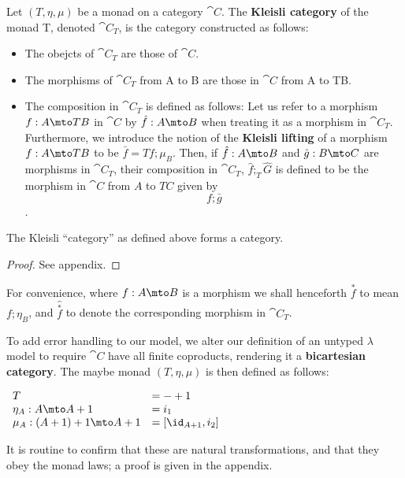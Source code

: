\begin{definition}
  Let $(T,\eta,\mu)$ be a monad on a category $\cat{C}$. The \textbf{Kleisli category}
  of the monad T, denoted $\cat{C}_T$, is the category constructed as follows:
  \begin{itemize}
    \item The obejcts of $\cat{C}_T$ are those of $\cat{C}$.
    \item The morphisms of $\cat{C}_T$ from A to B are those in $\cat{C}$ from A to TB.
    \item The composition in $\cat{C}_T$ is defined as follows: Let us refer to a
      morphism $f: A \mto TB$ in $\cat{C}$ by $\hat{f} : A \mto B$ when treating it as
      a morphism in $\cat{C}_T$. Furthermore, we introduce the notion of the \textbf{Kleisli
      lifting} of a morphism $f: A \mto TB$ to be $\bar{f} = Tf ; \mu_B$.
      Then, if $\hat{f} : A \mto B$ and $\hat{g} : B \mto C$
      are morphisms in $\cat{C}_T$, their composition in $\cat{C}_T$, $\hat{f} ;_T \hat{G}$
      is defined to be the morphism in $\cat{C}$ from $A$ to $TC$ given by
      \[
      f; \bar{g}
      \].
  \end{itemize}
\end{definition}

\begin{theorem}
  The Kleisli ``category'' as defined above forms a category.
\end{theorem}
\begin{proof}
  See appendix.
\end{proof}

For convenience, where $f: A \mto B$ is a morphism
we shall henceforth $\overset{*}{f}$ to mean $f;\eta_B$, and
$\hat{\overset{*}{f}}$ to denote the corresponding morphism
in $\cat{C}_T$.

To add error handling to our model, we alter our definition of an
untyped $\lambda$ model to require $\cat{C}$ have all
finite coproducts, rendering it a \textbf{bicartesian category}. The
maybe monad $(T, \eta, \mu)$ is then defined as follows:
\begin{center}
  \begin{math}
    \begin{array}{ll}
      T & = - + 1 \\
      \eta_A : A \mto A + 1 & = i_1 \\
      \mu_A : (A + 1) + 1 \mto A + 1 & = [ \id_{A+1}, i_2] \\
    \end{array}
  \end{math}
\end{center}
It is routine to confirm that these are natural transformations,
and that they obey the monad laws; a proof is given in the appendix.

